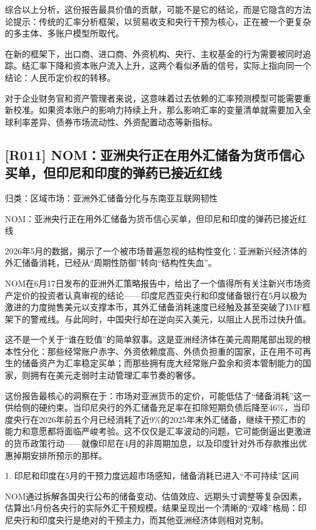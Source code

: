 \documentclass[11pt]{ctexart}
\begin{document}
综合以上分析，这份报告最具价值的贡献，可能不是它的结论，而是它隐含的方法论提示：传统的汇率分析框架，以贸易收支和央行干预为核心，正在被一个更复杂的多主体、多账户模型所取代。

在新的框架下，出口商、进口商、外资机构、央行、主权基金的行为需要被同时追踪。结汇率下降和资本账户流入上升，这两个看似矛盾的信号，实际上指向同一个结论：人民币定价权的转移。

对于企业财务官和资产管理者来说，这意味着过去依赖的汇率预测模型可能需要重新校准。如果资本账户的影响力持续上升，那么影响汇率的变量清单就需要加入全球利率差异、债券市场流动性、外资配置动态等新指标。

\subsection{[R011] NOM：亚洲央行正在用外汇储备为货币信心买单，但印尼和印度的弹药已接近红线}
{\small\color{refgray}归类：区域市场：亚洲外汇储备分化与东南亚互联网韧性}

NOM：亚洲央行正在用外汇储备为货币信心买单，但印尼和印度的弹药已接近红线

2026年5月的数据，揭示了一个被市场普遍忽视的结构性变化：亚洲新兴经济体的外汇储备消耗，已经从“周期性防御”转向“结构性失血”。

NOM在6月17日发布的亚洲外汇策略报告中，给出了一个值得所有关注新兴市场资产定价的投资者认真审视的结论——印度尼西亚央行和印度储备银行在5月以极为激进的力度抛售美元以支撑本币，其外汇储备消耗速度已经触及甚至突破了IMF框架下的警戒线。与此同时，中国央行却在逆向买入美元，以阻止人民币过快升值。

这不是一个关于“谁在贬值”的简单叙事。这是亚洲经济体在美元周期尾部出现的根本性分化：那些经常账户赤字、外资依赖度高、外债负担重的国家，正在用不可再生的储备资产为汇率稳定买单；而那些拥有庞大经常账户盈余和资本管制能力的国家，则拥有在美元走弱时主动管理汇率节奏的奢侈。

这份报告最核心的洞察在于：市场对亚洲货币的定价，可能低估了“储备消耗”这一供给侧的硬约束。当印尼央行的外汇储备充足率在扣除短期负债后降至46\%，当印度央行在2026年前五个月已经消耗了近9\%的2025年末外汇储备，继续干预汇市的能力和意愿都将面临严峻考验。这不仅仅是汇率波动的问题，它可能倒逼出更激进的货币政策行动——就像印尼在4月的非周期加息，以及印度针对外币存款推出优惠掉期安排所预示的那样。

1. 印尼和印度在5月的干预力度远超市场感知，储备消耗已进入“不可持续”区间

NOM通过拆解各国央行公布的储备变动、估值效应、远期头寸调整等复杂因素，估算出5月份各央行的实际外汇干预规模。结果呈现出一个清晰的“双峰”格局：印尼央行和印度央行是绝对的干预主力，而其他亚洲经济体则相对克制。
\end{document}
